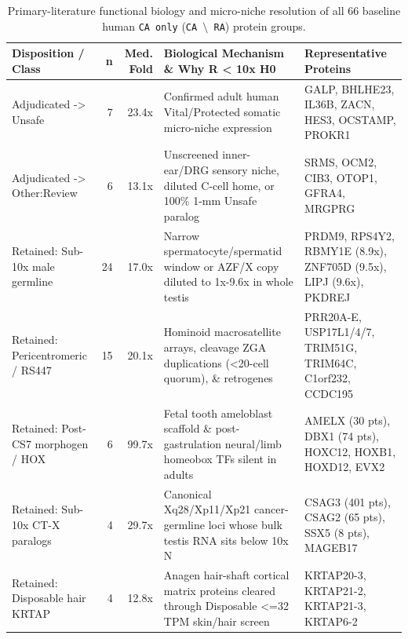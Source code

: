 \documentclass[10pt,letterpaper]{article}
\begin{document}
\begin{table}[htbp]
\centering
\scriptsize
\setlength{\tabcolsep}{3.5pt}
\caption{Primary-literature functional biology and micro-niche resolution of all 66 baseline human \texttt{CA only} (\texttt{CA $\setminus$ RA}) protein groups.}
\label{tab:caonly}
\begin{tabularx}{\textwidth}{p{3.1cm} r r p{5.4cm} X}
\toprule
\textbf{Disposition / Class} & \textbf{n} & \textbf{Med. Fold} & \textbf{Biological Mechanism \& Why R < 10x H0} & \textbf{Representative Proteins} \\
\midrule
Adjudicated -> Unsafe & 7 & 23.4x & Confirmed adult human Vital/Protected somatic micro-niche expression & GALP, BHLHE23, IL36B, ZACN, HES3, OCSTAMP, PROKR1 \\
Adjudicated -> Other:Review & 6 & 13.1x & Unscreened inner-ear/DRG sensory niche, diluted C-cell home, or 100\% 1-mm Unsafe paralog & SRMS, OCM2, CIB3, OTOP1, GFRA4, MRGPRG \\
Retained: Sub-10x male germline & 24 & 17.0x & Narrow spermatocyte/spermatid window or AZF/X copy diluted to 1x-9.6x in whole testis & PRDM9, RPS4Y2, RBMY1E (8.9x), ZNF705D (9.5x), LIPJ (9.6x), PKDREJ \\
Retained: Pericentromeric / RS447 & 15 & 20.1x & Hominoid macrosatellite arrays, cleavage ZGA duplications (<20-cell quorum), \& retrogenes & PRR20A-E, USP17L1/4/7, TRIM51G, TRIM64C, C1orf232, CCDC195 \\
Retained: Post-CS7 morphogen / HOX & 6 & 99.7x & Fetal tooth ameloblast scaffold \& post-gastrulation neural/limb homeobox TFs silent in adults & AMELX (30 pts), DBX1 (74 pts), HOXC12, HOXB1, HOXD12, EVX2 \\
Retained: Sub-10x CT-X paralogs & 4 & 29.7x & Canonical Xq28/Xp11/Xp21 cancer-germline loci whose bulk testis RNA sits below 10x N & CSAG3 (401 pts), CSAG2 (65 pts), SSX5 (8 pts), MAGEB17 \\
Retained: Disposable hair KRTAP & 4 & 12.8x & Anagen hair-shaft cortical matrix proteins cleared through Disposable <=32 TPM skin/hair screen & KRTAP20-3, KRTAP21-2, KRTAP21-3, KRTAP6-2 \\
\bottomrule
\end{tabularx}
\end{table}
\end{document}
